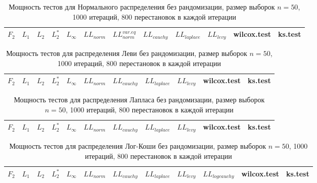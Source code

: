 \documentclass{article}
\begin{document}
\begin{longtable}{|c|c|c|c|c|c|c|c|c|c|c|c|}
  \caption{Мощность тестов для Нормального распределения без рандомизации, размер выборок $n=50$, 1000 итераций, 800 перестановок в каждой итерации}
  \label{table:n50} \\
  \hline
  $F_2$ & $L_{1}$ & $L_{2}$ & $L_2^*$ & $L_{\infty}$ & $LL_{norm}$ & $LL_{norm}^{var.eq}$ & $LL_{cauchy}$ & $LL_{laplace}$ & $LL_{levy}$ & wilcox.test & ks.test \\ \hline
  
\end{longtable}

\begin{longtable}{|c|c|c|c|c|c|c|c|c|c|c|}
  \caption{Мощность тестов для распределения Леви без рандомизации, размер выборок $n=50$, 1000 итераций, 800 перестановок в каждой итерации}
  \label{table:n50} \\
  \hline
  $F_2$ & $L_{1}$ & $L_{2}$ & $L_2^*$ & $L_{\infty}$ & $LL_{norm}$ & $LL_{cauchy}$ & $LL_{laplace}$ & $LL_{levy}$ & wilcox.test & ks.test \\ \hline
  
\end{longtable}

\begin{longtable}{|c|c|c|c|c|c|c|c|c|c|c|}
  \caption{Мощность тестов для распределения Лапласа без рандомизации, размер выборок $n=50$, 1000 итераций, 800 перестановок в каждой итерации}
  \label{table:n50} \\
  \hline
  $F_2$ & $L_{1}$ & $L_{2}$ & $L_2^*$ & $L_{\infty}$ & $LL_{norm}$ & $LL_{cauchy}$ & $LL_{laplace}$ & $LL_{levy}$ & wilcox.test & ks.test \\ \hline
  
\end{longtable}

\newpage

\begin{longtable}{|c|c|c|c|c|c|c|c|c|c|c|c|}
  \caption{Мощность тестов для распределения Лог-Коши без рандомизации, размер выборок $n=50$, 1000 итераций, 800 перестановок в каждой итерации}
  \label{table:n50} \\
  \hline
  $F_2$ & $L_{1}$ & $L_{2}$ & $L_2^*$ & $L_{\infty}$ & $LL_{norm}$ & $LL_{cauchy}$ & $LL_{laplace}$ & $LL_{levy}$ & $LL_{logcauchy}$ & wilcox.test & ks.test \\ \hline
  
\end{longtable}
\end{document}
